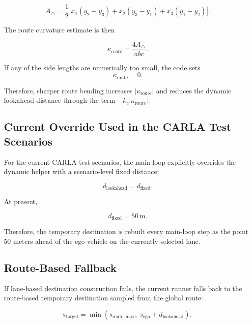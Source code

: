 \documentclass[11pt]{article}
\begin{document}
\begin{equation}
A_{\triangle}
=
\frac{1}{2}
\left|
x_1(y_2-y_3) + x_2(y_3-y_1) + x_3(y_1-y_2)
\right|.
\end{equation}

The route curvature estimate is then

\begin{equation}
\kappa_{\mathrm{route}} = \frac{4A_{\triangle}}{abc}.
\end{equation}

If any of the side lengths are numerically too small, the code sets
\[
\kappa_{\mathrm{route}} = 0.
\]

Therefore, sharper route bending increases $|\kappa_{\mathrm{route}}|$ and
reduces the dynamic lookahead distance through the term
$-k_c |\kappa_{\mathrm{route}}|$.

\subsection{Current Override Used in the CARLA Test Scenarios}

For the current CARLA test scenarios, the main loop explicitly overrides the
dynamic helper with a scenario-level fixed distance:

\begin{equation}
d_{\mathrm{lookahead}} = d_{\mathrm{fixed}}.
\end{equation}

At present,

\begin{equation}
d_{\mathrm{fixed}} = 50~\mathrm{m}.
\end{equation}

Therefore, the temporary destination is rebuilt every main-loop step as the
point $50$ meters ahead of the ego vehicle on the currently selected lane.

\subsection{Route-Based Fallback}

If lane-based destination construction fails, the current runner falls back to
the route-based temporary destination sampled from the global route:

\begin{equation}
s_{\mathrm{target}}
=
\min\!\left(
s_{\mathrm{route,max}},
\;
s_{\mathrm{ego}} + d_{\mathrm{lookahead}}
\right),
\end{equation}
\end{document}

